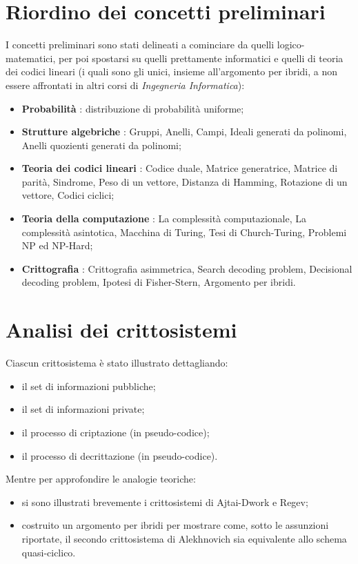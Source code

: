 \documentclass[12pt, a4paper]{report}
\theoremstyle{definition}
\begin{document}
		\section{Riordino dei concetti preliminari}
			I concetti preliminari sono stati delineati a cominciare da quelli logico-matematici, per poi spostarsi su quelli prettamente informatici e quelli di teoria dei codici lineari (i quali sono gli unici, insieme all'argomento per ibridi, a non essere affrontati in altri corsi di \emph{Ingegneria Informatica}):
			\begin{itemize}
				\item \textbf{Probabilità} : distribuzione di probabilità uniforme;
				\item \textbf{Strutture algebriche} : Gruppi, Anelli, Campi, Ideali generati da polinomi, Anelli quozienti generati da polinomi;
				\item \textbf{Teoria dei codici lineari} : Codice duale, Matrice generatrice, Matrice di parità, Sindrome, Peso di un vettore, Distanza di Hamming, Rotazione di un vettore, Codici ciclici;
				\item \textbf{Teoria della computazione} : La complessità computazionale, La complessità asintotica, Macchina di Turing, Tesi di Church-Turing, Problemi NP ed NP-Hard;
				\item \textbf{Crittografia} : Crittografia asimmetrica, Search decoding problem, Decisional decoding problem, Ipotesi di Fisher-Stern, Argomento per ibridi.
			\end{itemize}
		\section{Analisi dei crittosistemi}
			Ciascun crittosistema è stato illustrato dettagliando:
			\begin{itemize}
				\item il set di informazioni pubbliche;
				\item il set di informazioni private;
				\item il processo di criptazione (in pseudo-codice);
				\item il processo di decrittazione (in pseudo-codice).
			\end{itemize}
			Mentre per approfondire le analogie teoriche:
			\begin{itemize}
				\item si sono illustrati brevemente i crittosistemi di Ajtai-Dwork e Regev;
				\item costruito un argomento per ibridi per mostrare come, sotto le assunzioni riportate, il secondo crittosistema di Alekhnovich sia equivalente allo schema quasi-ciclico.
			\end{itemize} 
\end{document}
